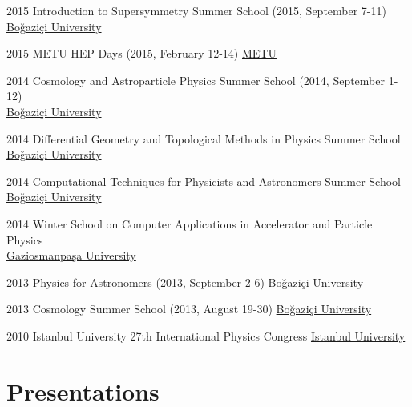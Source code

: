 \documentclass[]{friggeri-cv}
\begin{document}
\begin{entrylist}		 	
	\entryp
	{2015}
	{Introduction to Supersymmetry  Summer School \normalfont (2015, September 7-11)}
	{\href{http://fezagursey.boun.edu.tr/?sayfa=29}{Boğaziçi University}}
	
	\entryp
	{2015}
	{METU HEP Days  \normalfont (2015, February 12-14)}
	{\href{http://yef.ankara.edu.tr/yefgunleri2015/index.html}{METU}}
	
	\entryp
	{2014}
	{Cosmology and Astroparticle Physics Summer School \normalfont (2014, September 1-12) \\}
	{\href{http://fezagursey.boun.edu.tr/?sayfa=33}{Boğaziçi University}}
	
	\entryp
	{2014}
	{Differential Geometry and Topological Methods in Physics Summer School \\}
	{\href{http://fezagursey.boun.edu.tr/?sayfa=32}{Boğaziçi University}}
	
	\entryp
	{2014}
	{Computational Techniques for Physicists and Astronomers Summer School \\}
	{\href{http://fezagursey.boun.edu.tr/?sayfa=31}{Boğaziçi University}}
	
	\entryp
	{2014}
	{Winter School on Computer Applications in Accelerator and Particle Physics \\}
	{\href{http://hpfbu.web.cern.ch/hpfbu/HPFBU2014/HPFBU2014.html}{Gaziosmanpaşa University}}
	
	\entryp
	{2013}
	{Physics for Astronomers \normalfont (2013, September 2-6)}
	{\href{http://fezagursey.boun.edu.tr/?sayfa=36}{Boğaziçi University}}
	
	\entryp
	{2013}
	{Cosmology Summer School \normalfont (2013, August 19-30)}
	{\href{http://fezagursey.boun.edu.tr/?sayfa=35}{Boğaziçi University}}
	
	\entryp
	{2010}
	{Istanbul University 27th International Physics  Congress}
	{\href{http://www.tfd.com.tr/arsiv/TFD/27/Wc9f53756aa549.htm}{Istanbul University}}
	
\end{entrylist}

\newpage

\section{Presentations}
\end{document}
